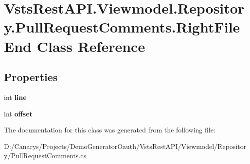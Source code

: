 \hypertarget{class_vsts_rest_a_p_i_1_1_viewmodel_1_1_repository_1_1_pull_request_comments_1_1_right_file_end}{}\section{Vsts\+Rest\+A\+P\+I.\+Viewmodel.\+Repository.\+Pull\+Request\+Comments.\+Right\+File\+End Class Reference}
\label{class_vsts_rest_a_p_i_1_1_viewmodel_1_1_repository_1_1_pull_request_comments_1_1_right_file_end}
\subsection*{Properties}
\begin{DoxyCompactItemize}
\item 
\mbox{\label{class_vsts_rest_a_p_i_1_1_viewmodel_1_1_repository_1_1_pull_request_comments_1_1_right_file_end_a1060faca717be9b5a8f9982c160cb928}} 
int {\bfseries line}
\item 
\mbox{\label{class_vsts_rest_a_p_i_1_1_viewmodel_1_1_repository_1_1_pull_request_comments_1_1_right_file_end_ad0ecbc0cb986a1d10f0f3c868a26fca7}} 
int {\bfseries offset}
\end{DoxyCompactItemize}


The documentation for this class was generated from the following file\+:\begin{DoxyCompactItemize}
\item 
D\+:/\+Canarys/\+Projects/\+Demo\+Generator\+Oauth/\+Vsts\+Rest\+A\+P\+I/\+Viewmodel/\+Repository/Pull\+Request\+Comments.\+cs\end{DoxyCompactItemize}
